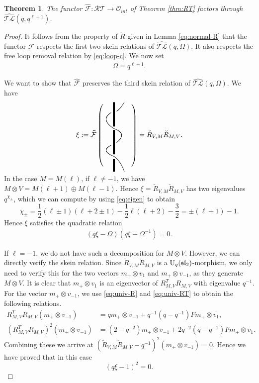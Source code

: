 \documentclass[12pt]{amsart}
\newtheorem{theorem}{Theorem}[section]
\theoremstyle{definition}
\theoremstyle{remark}
\numberwithin{equation}{section}
\newcommand{\CF}{{\mathcal F}}
\newcommand{\CO}{{\mathcal O}}
\newcommand{\U}{{\rm{U}}}
\newcommand{\fsl}{{\mathfrak {sl}}}
\newcommand{\ATLC}{{\widehat{\mathcal{TL}}}}
\newcommand{\RTC}{\mathcal{RT}}
\begin{document}
\begin{theorem}\label{thm:functor-quot}
The functor $\widehat\CF:  \RTC\longrightarrow \CO_{int}$ of Theorem \ref{thm:RT} 
factors through $\ATLC(q, q^{\ell+1})$.  
\end{theorem}
\begin{proof}
It follows from the property of $\check{R}$ given in Lemma \ref{eq:normal-R} that the functor 
$\widehat\CF$ respects the first two skein relations of $\ATLC(q, \Omega)$.  
It also respects the free loop removal relation by \eqref{eq:loop-c}.  
We now set  
\begin{eqnarray}\label{eq:omega-value}
\Omega=q^{\ell+1}. 
\end{eqnarray}

We want to show that $\widehat\CF$ preserves the third skein relation of $\ATLC(q, \Omega)$. 
We have 
\[
\xi:=\widehat\CF\left(
\begin{picture}(40, 50)(-30,50)
{
\linethickness{1mm}
\put(-15, 65){\line(0, 1){35}}
\put(-15, 25){\line(0, 1){35}}
\put(-15, 0){\line(0, 1){18}}
}
\qbezier(-19, 38)(-35, 30)(-15, 22)
\qbezier(-15, 62)(5, 55)(-11, 42)
\qbezier(-15, 62)(-35, 75)(-19, 85)
\qbezier(0, 100)(-6, 90)(-11, 87)
\qbezier(-15, 22)(-5, 15)(0, 0)
\end{picture}
\right) = \check{R}_{V, M}\check{R}_{M, V}. 
\]
\vspace{.5mm}

In the case $M=M(\ell)$, if $\ell\ne -1$, we have $M\otimes V= M(\ell+1)\oplus M(\ell-1)$.  Hence  
$\xi=\check{R}_{V, M}\check{R}_{M, V}$ has two eigenvalues $q^{\chi_\pm}$, 
which we can compute by using \eqref{eq:eigen} to obtain 
\[
\chi_\pm = \frac{1}{2}(\ell \pm1)(\ell+2\pm 1) - \frac{1}{2}\ell (\ell+2) - \frac{3}{2} =\pm (\ell +1)-1.
\]
Hence $\xi$ satisfies the quadratic relation
\begin{eqnarray}\label{eq:skein-3}
(q\xi-\Omega)(q\xi-\Omega^{-1})=0. 
\end{eqnarray}

If $\ell=-1$, we do not have such a decomposition for $M\otimes V$.  However, we can directly verify the 
skein relation. Since $\check{R}_{V, M}\check{R}_{M, V}$ is a $\U_q(\fsl_2)$-morphism, we only need
 to verify this for the two vectors $m_+\otimes v_1$ and $m_+\otimes v_{-1}$, as they generate $M\otimes V$. 
%
It is clear that $m_+\otimes v_1$ is an eigenvector of $R^T_{M, V}R_{M, V}$ with eigenvalue $q^{-1}$. 
For the vector $m_+\otimes v_{-1}$, we use \eqref{eq:univ-R} and \eqref{eq:univ-RT} to obtain the following relations. 
\[
\begin{aligned}
R^T_{M, V}R_{M, V}(m_+\otimes v_{-1}) &= q m_+\otimes v_{-1} + q^{-1}(q-q^{-1}) F m_+\otimes v_1,\\
(R^T_{M, V}R_{M, V})^2 (m_+\otimes v_{-1})&= (2-q^{-2}) m_+\otimes v_{-1} + 2q^{-2}(q-q^{-1}) F m_+\otimes v_1.
\end{aligned}
\]
Combining these we arrive at $(\check{R}_{V, M}\check{R}_{M, V}-q^{-1})^2(m_+\otimes v_{-1}) =0$.  
Hence we have proved that   in this case
\[
(q\xi-1)^2=0.
\]


\end{proof}
\end{document}

